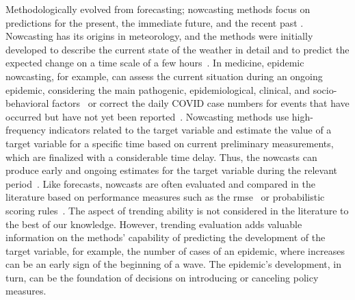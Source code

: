 Methodologically evolved from forecasting; nowcasting methods focus on predictions for the present, the immediate future, and the recent past \citep{banbura2013now}.
Nowcasting has its origins in meteorology, and the methods were initially developed to describe the current state of the weather in detail and to predict the expected change on a time scale of a few hours~\citep{browning1989nowcasting,schmid2019nowcasting}.
In medicine, epidemic nowcasting, for example, can assess the current situation during an ongoing epidemic, considering the main pathogenic, epidemiological, clinical, and socio-behavioral factors~\citep{wu2021nowcasting} or correct the daily COVID case numbers for events that have occurred but have not yet been reported~\citep{gunther2021nowcasting}.
Nowcasting methods use high-frequency indicators related to the target variable and estimate the value of a target variable for a specific time based on current preliminary measurements, which are finalized with a considerable time delay. 
Thus, the nowcasts can produce early and ongoing estimates for the target variable during the relevant period~\citep{castle2017forecasting}.
Like forecasts, nowcasts are often evaluated and compared in the literature based on performance measures such as the \ac{rmse}~\citep{gunther2021nowcasting} or probabilistic scoring rules~\citep{Wolffram2023}.
The aspect of trending ability is not considered in the literature to the best of our knowledge. 
However, trending evaluation adds valuable information on the methods' capability of predicting the development of the target variable, for example, the number of cases of an epidemic, where increases can be an early sign of the beginning of a wave.
The epidemic's development, in turn, can be the foundation of decisions on introducing or canceling policy measures. 

